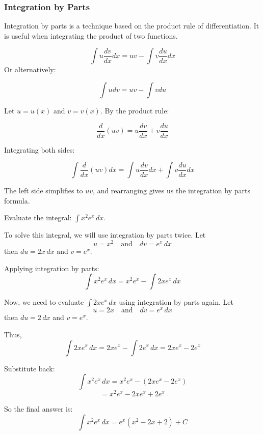 \subsubsection{Integration by Parts}

\begin{definition}
Integration by parts is a technique based on the product rule of differentiation. It is useful when integrating the product of two functions.


$$
\int u \frac{dv}{dx} dx = uv - \int v \frac{du}{dx} dx
$$
Or alternatively:

$$\int u d v=u v-\int v d u$$

\end{definition}

\begin{theorem}
Let $u = u(x)$ and $v = v(x)$. By the product rule:

$$
\frac{d}{dx}(uv) = u\frac{dv}{dx} + v\frac{du}{dx}
$$

Integrating both sides:

$$
\int \frac{d}{dx}(uv) dx = \int u\frac{dv}{dx} dx + \int v\frac{du}{dx} dx
$$

The left side simplifies to $uv$, and rearranging gives us the integration by parts formula.
\end{theorem}

\begin{exercise}
Evaluate the integral: $\int x^2 e^x \, dx$.

\end{exercise}
\begin{solution}
To solve this integral, we will use integration by parts twice. Let
\[
u = x^2 \quad \text{and} \quad dv = e^x \, dx
\]
then \( du = 2x \, dx \) and \( v = e^x \).

Applying integration by parts:
\[
\int x^2 e^x \, dx = x^2 e^x - \int 2x e^x \, dx
\]

Now, we need to evaluate \( \int 2x e^x \, dx \) using integration by parts again. Let
\[
u = 2x \quad \text{and} \quad dv = e^x \, dx
\]
then \( du = 2 \, dx \) and \( v = e^x \).

Thus,
\[
\int 2x e^x \, dx = 2x e^x - \int 2 e^x \, dx = 2x e^x - 2 e^x
\]

Substitute back:
\[
\int x^2 e^x \, dx = x^2 e^x - (2x e^x - 2 e^x)
\]
\[
= x^2 e^x - 2x e^x + 2 e^x
\]

So the final answer is:
\[
\int x^2 e^x \, dx = e^x (x^2 - 2x + 2) + C
\]
\end{solution}


